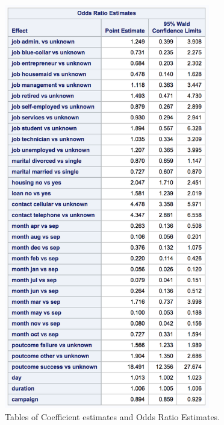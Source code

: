 \documentclass[]{article}
\begin{document}
\begin{figure}
  \centering
    \includegraphics[width=0.8\textwidth]{images/fig21b_odds.png}
  \caption{Tables of Coefficient estimates and Odds Ratio Estimates.}
  \label{fig21b}
\end{figure}
\end{document}
